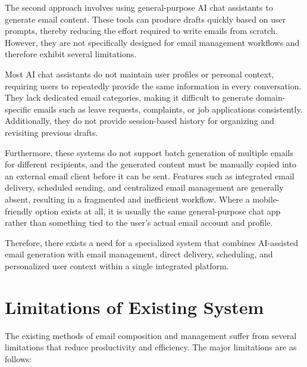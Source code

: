 \documentclass[12pt,a4paper]{article}
\begin{document}
The second approach involves using general-purpose AI chat assistants to generate email content. These tools can produce drafts quickly based on user prompts, thereby reducing the effort required to write emails from scratch. However, they are not specifically designed for email management workflows and therefore exhibit several limitations.

Most AI chat assistants do not maintain user profiles or personal context, requiring users to repeatedly provide the same information in every conversation. They lack dedicated email categories, making it difficult to generate domain-specific emails such as leave requests, complaints, or job applications consistently. Additionally, they do not provide session-based history for organizing and revisiting previous drafts.

Furthermore, these systems do not support batch generation of multiple emails for different recipients, and the generated content must be manually copied into an external email client before it can be sent. Features such as integrated email delivery, scheduled sending, and centralized email management are generally absent, resulting in a fragmented and inefficient workflow. Where a mobile-friendly option exists at all, it is usually the same general-purpose chat app rather than something tied to the user's actual email account and profile.

Therefore, there exists a need for a specialized system that combines AI-assisted email generation with email management, direct delivery, scheduling, and personalized user context within a single integrated platform.


\section{Limitations of Existing System}

The existing methods of email composition and management suffer from several limitations that reduce productivity and efficiency. The major limitations are as follows:
\end{document}
